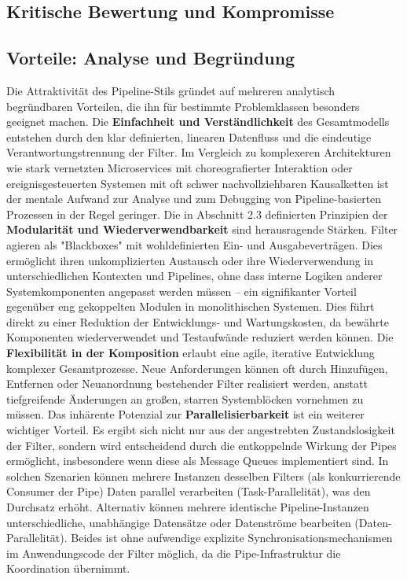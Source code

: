 \documentclass[10pt]{article}
\begin{document}
\begin{multicols}{2}
\section{Kritische Bewertung und Kompromisse}
\subsection{Vorteile: Analyse und Begründung}
Die Attraktivität des Pipeline-Stils gründet auf mehreren analytisch begründbaren Vorteilen, die ihn für bestimmte Problemklassen besonders geeignet machen. Die \textbf{Einfachheit und Verständlichkeit} des Gesamtmodells entstehen durch den klar definierten, linearen Datenfluss und die eindeutige Verantwortungstrennung der Filter. Im Vergleich zu komplexeren Architekturen wie stark vernetzten Microservices mit choreografierter Interaktion oder ereignisgesteuerten Systemen mit oft schwer nachvollziehbaren Kausalketten ist der mentale Aufwand zur Analyse und zum Debugging von Pipeline-basierten Prozessen in der Regel geringer.\cite{richards2020}
Die in Abschnitt 2.3 definierten Prinzipien der \textbf{Modularität und Wiederverwendbarkeit}\cite{packt_cpp_architecture} sind herausragende Stärken. Filter agieren als "Blackboxes" mit wohldefinierten Ein- und Ausgabeverträgen. Dies ermöglicht ihren unkomplizierten Austausch oder ihre Wiederverwendung in unterschiedlichen Kontexten und Pipelines, ohne dass interne Logiken anderer Systemkomponenten angepasst werden müssen – ein signifikanter Vorteil gegenüber eng gekoppelten Modulen in monolithischen Systemen. Dies führt direkt zu einer Reduktion der Entwicklungs- und Wartungskosten, da bewährte Komponenten wiederverwendet und Testaufwände reduziert werden können.\cite{dagster_data_pipeline}
Die \textbf{Flexibilität in der Komposition} erlaubt eine agile, iterative Entwicklung komplexer Gesamtprozesse. Neue Anforderungen können oft durch Hinzufügen, Entfernen oder Neuanordnung bestehender Filter realisiert werden, anstatt tiefgreifende Änderungen an großen, starren Systemblöcken vornehmen zu müssen.
Das inhärente Potenzial zur \textbf{Parallelisierbarkeit} ist ein weiterer wichtiger Vorteil. Es ergibt sich nicht nur aus der angestrebten Zustandslosigkeit der Filter, sondern wird entscheidend durch die entkoppelnde Wirkung der Pipes ermöglicht, insbesondere wenn diese als Message Queues implementiert sind. In solchen Szenarien können mehrere Instanzen desselben Filters (als konkurrierende Consumer der Pipe) Daten parallel verarbeiten (Task-Parallelität), was den Durchsatz erhöht. Alternativ können mehrere identische Pipeline-Instanzen unterschiedliche, unabhängige Datensätze oder Datenströme bearbeiten (Daten-Parallelität). Beides ist ohne aufwendige explizite Synchronisationsmechanismen im Anwendungscode der Filter möglich, da die Pipe-Infrastruktur die Koordination übernimmt.\cite{researchgate_parallel_pipes}


\end{multicols}
\end{document}
